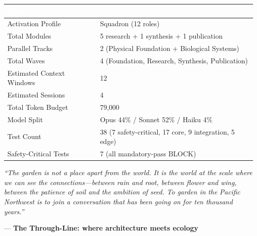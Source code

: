 \documentclass[11pt,letterpaper]{article}
\newcommand{\tableheader}[1]{\textbf{\sffamily\textcolor{white}{#1}}}
\begin{document}
\begin{center}
\begin{tabularx}{\textwidth}{L{5cm}X}
\toprule
{}
\tableheader{Metric} & \tableheader{Value} \\
\midrule
Activation Profile & Squadron (12 roles) \\
Total Modules & 5 research + 1 synthesis + 1 publication \\
Parallel Tracks & 2 (Physical Foundation + Biological Systems) \\
Total Waves & 4 (Foundation, Research, Synthesis, Publication) \\
Estimated Context Windows & 12 \\
Estimated Sessions & 4 \\
Total Token Budget & 79,000 \\
Model Split & Opus 44\% / Sonnet 52\% / Haiku 4\% \\
Test Count & 38 (7 safety-critical, 17 core, 9 integration, 5 edge) \\
Safety-Critical Tests & 7 (all mandatory-pass BLOCK) \\
\bottomrule
\end{tabularx}
\end{center}

\vspace{2em}

\begin{quotebox}
\textit{``The garden is not a place apart from the world. It is the world at the scale where we can see the connections---between rain and root, between flower and wing, between the patience of soil and the ambition of seed. To garden in the Pacific Northwest is to join a conversation that has been going on for ten thousand years.''} \par\vspace{0.5em}
\hfill --- \textbf{The Through-Line: where architecture meets ecology}
\end{quotebox}
\end{document}
